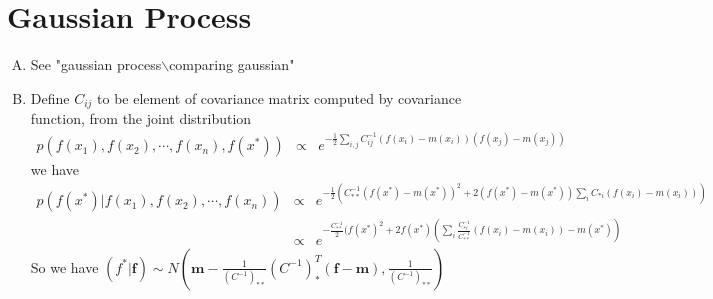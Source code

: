\documentclass{article}
\begin{document}
\section{Gaussian Process}
\begin{enumerate}[(A)]
\item
See "gaussian process$\backslash$comparing gaussian"
\item
Define $C_{ij}$ to be element of covariance matrix computed by covariance function, from the joint distribution
\begin{eqnarray}
p(f(x_1),f(x_2),\cdots,f(x_n),f(x^*))&\propto&e^{-\frac{1}{2}\sum_{i,j}C^{-1}_{ij}(f(x_i)-m(x_i))(f(x_j)-m(x_j))}
\end{eqnarray}
we have
\begin{eqnarray}
p(f(x^*)|f(x_1),f(x_2),\cdots,f(x_n))&\propto&e^{-\frac{1}{2}(C^{-1}_{**}(f(x^*)-m(x^*))^2+2(f(x^*)-m(x^*))\sum_iC_{*i}(f(x_i)-m(x_i)))}\nonumber\\
&\propto&e^{-\frac{C^{-1}_{**}}{2}(f(x^*)^2+2f(x^*)(\sum_i\frac{C^{-1}_{*i}}{C^{-1}_{**}}(f(x_i)-m(x_i))-m(x^*))}
\end{eqnarray}
So we have $(f^*|\mathbf{f})\sim N(\mathbf{m}-\frac{1}{(C^{-1})_{**}}(C^{-1})_*^T(\mathbf{f}-\mathbf{m}),\frac{1}{(C^{-1})_{**}})$


\end{enumerate}
\end{document}
